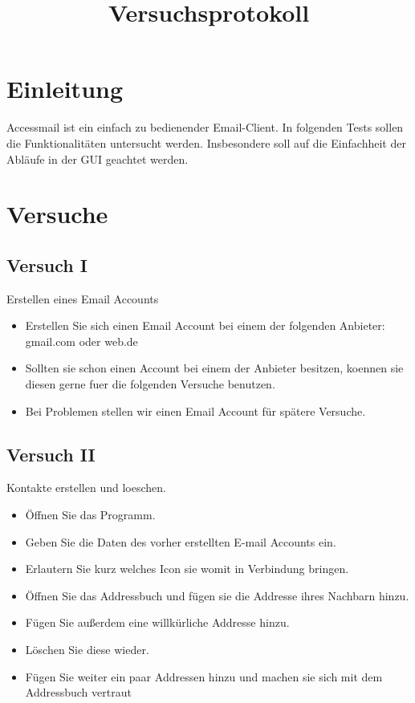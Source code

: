 \documentclass[10pt,a4paper]{article}
\title{Versuchsprotokoll}
\begin{document}
\maketitle
\section*{Einleitung}
Accessmail ist ein einfach zu bedienender Email-Client. In folgenden Tests 
sollen die Funktionalitäten untersucht werden. Insbesondere 
soll auf die Einfachheit der Abläufe in der GUI geachtet werden.
\section*{Versuche}
\subsection*{Versuch I}
Erstellen eines Email Accounts
\begin{itemize}
	\item Erstellen Sie sich einen Email Account bei einem der folgenden Anbieter: gmail.com oder web.de
	\item Sollten sie schon einen Account bei einem der Anbieter besitzen, koennen sie diesen gerne fuer die folgenden Versuche benutzen.
	\item Bei Problemen stellen wir einen Email Account für spätere Versuche.
\end{itemize}
\subsection*{Versuch II}
Kontakte erstellen und loeschen.
\begin{itemize}
	\item Öffnen Sie das Programm.
	\item Geben Sie die Daten des vorher erstellten E-mail Accounts ein.
	\item Erlautern Sie kurz welches Icon sie womit in Verbindung bringen.
	\item Öffnen Sie das Addressbuch und fügen sie die Addresse ihres Nachbarn hinzu.
	\item Fügen Sie außerdem eine willkürliche Addresse hinzu.
	\item Löschen Sie diese wieder.
	\item Fügen Sie weiter ein paar Addressen hinzu und machen sie sich mit dem Addressbuch vertraut	
\end{itemize}
\end{document}
